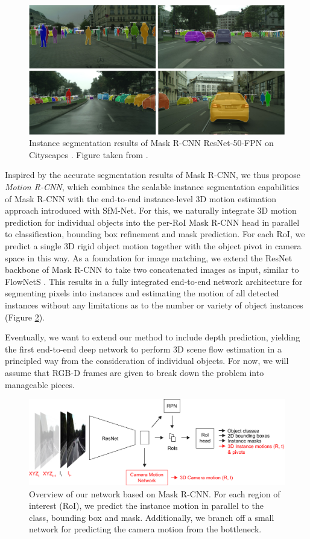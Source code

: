 \begin{figure}[t]
  \centering
  \includegraphics[width=\textwidth]{figures/maskrcnn_cs}
\caption{
Instance segmentation results of Mask R-CNN ResNet-50-FPN \cite{MaskRCNN}
on Cityscapes \cite{Cityscapes}. Figure taken from \cite{MaskRCNN}.
}
\label{figure:maskrcnn_cs}
\end{figure}
Inspired by the accurate segmentation results of Mask R-CNN,
we thus propose \emph{Motion R-CNN}, which combines the scalable instance segmentation capabilities of
Mask R-CNN with the end-to-end instance-level 3D motion estimation approach introduced with SfM-Net.
For this, we naturally integrate 3D motion prediction for individual objects into the per-RoI Mask R-CNN head
in parallel to classification, bounding box refinement and mask prediction.
For each RoI, we predict a single 3D rigid object motion together with the object
pivot in camera space in this way.
As a foundation for image matching, we extend the ResNet \cite{ResNet} backbone of Mask R-CNN to take
two concatenated images as input, similar to FlowNetS \cite{FlowNet}.
This results in a fully integrated end-to-end network architecture for segmenting pixels into instances
and estimating the motion of all detected instances without any limitations
as to the number or variety of object instances (Figure \ref{figure:net_intro}).

Eventually, we want to extend our method to include depth prediction,
yielding the first end-to-end deep network to perform 3D scene flow estimation
in a principled way from the consideration of individual objects.
For now, we will assume that RGB-D frames are given to break down the problem into
manageable pieces.

\begin{figure}[t]
  \centering
  \includegraphics[width=\textwidth]{figures/net_intro}
\caption{
Overview of our network based on Mask R-CNN. For each region of interest (RoI), we predict the instance motion
in parallel to the class, bounding box and mask. Additionally, we branch off a
small network for predicting the camera motion from the bottleneck.
}
\label{figure:net_intro}
\end{figure}

